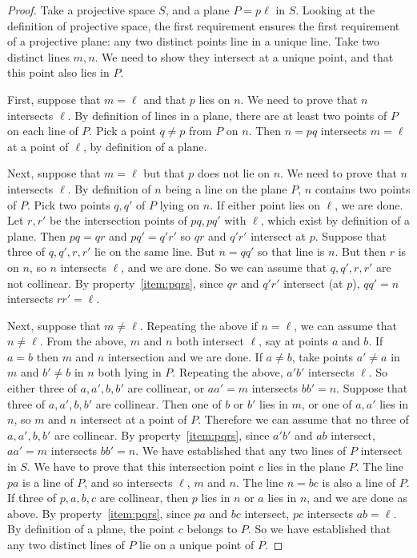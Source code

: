 \begin{proof}
Take a projective space \(S\), and a plane \(P=p\ell\) in \(S\).
Looking at the definition of projective space, the first requirement ensures the first requirement of a projective plane: any two distinct points line in a unique line.
Take two distinct lines \(m, n\).
We need to show they intersect at a unique point, and that this point also lies in \(P\).

First, suppose that \(m=\ell\) and that \(p\) lies on \(n\).
We need to prove that \(n\) intersects \(\ell\).
By definition of lines in a plane, there are at least two points of \(P\) on each line of \(P\). 
Pick a point \(q \ne p\) from \(P\) on \(n\).
Then \(n=pq\) intersects \(m=\ell\) at a point of \(\ell\), by definition of a plane.

Next, suppose that \(m=\ell\) but that \(p\) does not lie on \(n\).
We need to prove that \(n\) intersects \(\ell\).
By definition of \(n\) being a line on the plane \(P\), \(n\) contains two points of \(P\).
Pick two points \(q, q'\) of \(P\) lying on \(n\).
If either point lies on \(\ell\), we are done.
Let \(r, r'\) be the intersection points of \(pq, pq'\) with \(\ell\), which exist by definition of a plane.
Then \(pq=qr\) and \(pq'=q'r'\) so \(qr\) and \(q'r'\) intersect at \(p\).
Suppose that three of \(q, q', r, r'\) lie on the same line.
But \(n=qq'\) so that line is \(n\).
But then \(r\) is on \(n\), so \(n\) intersects \(\ell\), and we are done.
So we can assume that \(q, q', r, r'\) are not collinear.
By property~\vref{item:pqrs}, since \(qr\) and \(q'r'\) intersect (at \(p\)), \(qq'=n\) intersects \(rr'=\ell\).

Next, suppose that \(m \ne \ell\).
Repeating the above if \(n=\ell\), we can assume that \(n \ne \ell\).
From the above, \(m\) and \(n\) both intersect \(\ell\), say at points \(a\) and \(b\).
If \(a=b\) then \(m\) and \(n\) intersection and we are done.
If \(a \ne b\), take points \(a' \ne a\) in \(m\) and \(b' \ne b\) in \(n\) both lying in \(P\).
Repeating the above, \(a'b'\) intersects \(\ell\).
So either three of \(a, a', b, b'\) are collinear, or \(aa'=m\) intersects \(bb'=n\).
Suppose that three of \(a, a', b, b'\) are collinear.
Then one of \(b\) or \(b'\) lies in \(m\), or one of \(a, a'\) lies in \(n\), so \(m\) and \(n\) intersect at a point of \(P\).
Therefore we can assume that no three of \(a, a', b, b'\) are collinear.
By property~\vref{item:pqrs}, since \(a'b'\) and \(ab\) intersect, \(aa'=m\) intersects \(bb'=n\).
We have established that any two lines of \(P\) intersect in \(S\).
We have to prove that this intersection point \(c\) lies in the plane \(P\).
The line \(pa\) is a line of \(P\), and so intersects \(\ell\), \(m\) and \(n\).
The line \(n=bc\) is also a line of \(P\).
If three of \(p, a, b, c\) are collinear, then \(p\) lies in \(n\) or \(a\) lies in \(n\), and we are done as above.
By property~\vref{item:pqrs}, since \(pa\) and \(bc\) intersect, \(pc\) intersects \(ab=\ell\).
By definition of a plane, the point \(c\) belongs to \(P\).
So we have established that any two distinct lines of \(P\) lie on a unique point of \(P\).


\end{proof}
